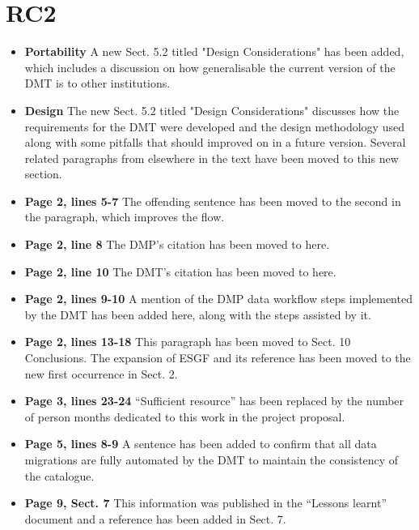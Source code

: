 \documentclass[12pt,a4paper]{article}
\begin{document}
\section{RC2}
\begin{itemize}
\item \textbf{Portability} A new Sect. 5.2 titled "Design Considerations" has been added, which includes a discussion on how generalisable the current version of the DMT is to other institutions.
	 
\item \textbf{Design} The new Sect. 5.2 titled "Design Considerations" discusses how the requirements for the DMT were developed and the design methodology used along with some pitfalls that should improved on in a future version. Several related paragraphs from elsewhere in the text have been moved to this new section.

\item \textbf{Page 2, lines 5-7} The offending sentence has been moved to the second in the paragraph, which improves the flow.

\item \textbf{Page 2, line 8} The DMP's citation has been moved to here.

\item \textbf{Page 2, line 10} The DMT's citation has been moved to here.

\item \textbf{Page 2, lines 9-10} A mention of the DMP data workflow steps implemented by the DMT has been added here, along with the steps assisted by it.

\item \textbf{Page 2, lines 13-18} This paragraph has been moved to Sect. 10 Conclusions. The expansion of ESGF and its reference has been moved to the new first occurrence in Sect. 2.

\item \textbf{Page 3, lines 23-24} ``Sufficient resource'' has been replaced by the number of person months dedicated to this work in the project proposal.

\item \textbf{Page 5, lines 8-9} A sentence has been added to confirm that all data migrations are fully automated by the DMT to maintain the consistency of the catalogue.

\item \textbf{Page 9, Sect. 7} This information was published in the ``Lessons learnt'' document and a reference has been added in Sect. 7.


\end{itemize}
\end{document}

